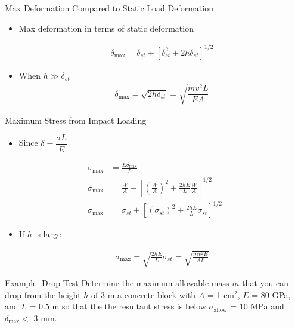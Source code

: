 \documentclass[10pt, svgnames]{beamer}
\begin{document}
\begin{frame}[label={sec:orge36818a}]{Max Deformation Compared to Static Load Deformation}
\begin{itemize}
\item Max deformation in terms of static deformation

\begin{gather*}
  \delta_{\max} = \delta_{st} + \left[ \delta_{st}^2 + 2h \delta_{st} \right]^{1/2}
\end{gather*}

\item When \(h \gg \delta_{st}\)
\begin{gather*}
  \delta_{\max} = \sqrt{2h \delta_{st}} = \sqrt{ \dfrac{mv^2 L}{EA} }
\end{gather*}
\end{itemize}
\end{frame}

\begin{frame}[label={sec:orgdc59b76}]{Maximum Stress from Impact Loading}
\begin{itemize}
\item Since \(\delta = \dfrac{\sigma L}{E}\)
\end{itemize}

\begin{align*}
    \sigma_{\max} &= \frac{E\delta_{\max}}{L} \\
    \sigma_{\max} &= \frac{W}{A} + \left[ \left( \frac{W}{A} \right)^2 + \frac{2hE}{L}\frac{W}{A} \right]^{1/2} \\
    \sigma_{\max} &= \sigma_{st} + \left[ \left( \sigma_{st} \right)^2 + \frac{2hE}{L} \sigma_{st} \right]^{1/2}
\end{align*}

\begin{itemize}
\item If \(h\) is large

\begin{align*}
  \sigma_{\max} = \sqrt{ \frac{2hE}{L} \sigma_{st} } = \sqrt{ \frac{mv^2 E}{AL} }
\end{align*}
\end{itemize}
\end{frame}

\begin{frame}[label={sec:orga7e1365}]{Example: Drop Test}
Determine the maximum allowable mass \(m\) that you
can drop from the height \(h\) of 3 m a concrete block with \(A\) = 1
cm\(^{2}\), \(E\) = 80 GPa, and \(L\) = 0.5 m so that the the resultant
stress is below \(\sigma_{\text{allow}}\) = 10 MPa and
\(\delta_{\max} <\) 3 mm.
\end{frame}
\end{document}
